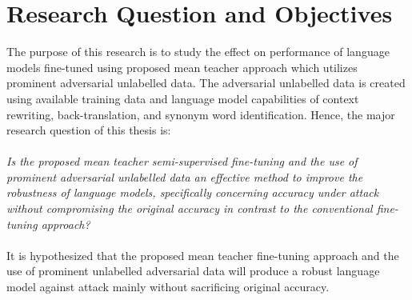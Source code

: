 \documentclass[%
	BCOR=8mm, %
	DIV=12,
	toc=bibliography, %
	toc=listof, %
	oneside, %
	egregdoesnotlikesansseriftitles, %
	]{scrbook}
\begin{document}
\section{Research Question and Objectives}
\label{section:researchquestions}
The purpose of this research is to study the effect on performance of language models fine-tuned using proposed mean teacher approach which utilizes prominent adversarial unlabelled data. The adversarial unlabelled data is created using available training data and language model capabilities of context rewriting, back-translation, and synonym word identification. Hence, the major research question of this thesis is: \\\\
 \emph{Is the proposed mean teacher semi-supervised fine-tuning and the use of prominent adversarial unlabelled data an effective method to improve the robustness of language models, specifically concerning accuracy under attack without compromising the original accuracy in contrast to the conventional fine-tuning approach?}\\\\
It is hypothesized that the proposed mean teacher  fine-tuning approach and the use of prominent unlabelled adversarial data will produce a robust language model against attack mainly without sacrificing original accuracy. \\
\end{document}
